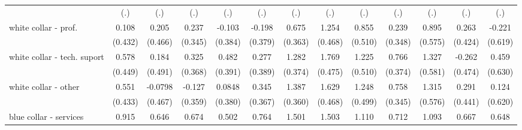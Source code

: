 {\begin{tabular}{l*{12}{c}}
                    &         (.)         &         (.)         &         (.)         &         (.)         &         (.)         &         (.)         &         (.)         &         (.)         &         (.)         &         (.)         &         (.)         &         (.)         \\
[1em]
white collar - prof.&       0.108         &       0.205         &       0.237         &      -0.103         &      -0.198         &       0.675         &       1.254\sym{**} &       0.855         &       0.239         &       0.895         &       0.263         &      -0.221         \\
                    &     (0.432)         &     (0.466)         &     (0.345)         &     (0.384)         &     (0.379)         &     (0.363)         &     (0.468)         &     (0.510)         &     (0.348)         &     (0.575)         &     (0.424)         &     (0.619)         \\
[1em]
white collar - tech. suport&       0.578         &       0.184         &       0.325         &       0.482         &       0.277         &       1.282\sym{***}&       1.769\sym{***}&       1.225\sym{*}  &       0.766\sym{*}  &       1.327\sym{*}  &      -0.262         &       0.459         \\
                    &     (0.449)         &     (0.491)         &     (0.368)         &     (0.391)         &     (0.389)         &     (0.374)         &     (0.475)         &     (0.510)         &     (0.374)         &     (0.581)         &     (0.474)         &     (0.630)         \\
[1em]
white collar - other&       0.551         &     -0.0798         &      -0.127         &      0.0848         &       0.345         &       1.387\sym{***}&       1.629\sym{***}&       1.248\sym{*}  &       0.758\sym{*}  &       1.315\sym{*}  &       0.291         &       0.124         \\
                    &     (0.433)         &     (0.467)         &     (0.359)         &     (0.380)         &     (0.367)         &     (0.360)         &     (0.468)         &     (0.499)         &     (0.345)         &     (0.576)         &     (0.441)         &     (0.620)         \\
[1em]
blue collar - services&       0.915\sym{*}  &       0.646         &       0.674         &       0.502         &       0.764\sym{*}  &       1.501\sym{***}&       1.503\sym{**} &       1.110\sym{*}  &       0.712\sym{*}  &       1.093         &       0.667         &       0.648         \\

\end{tabular}}
